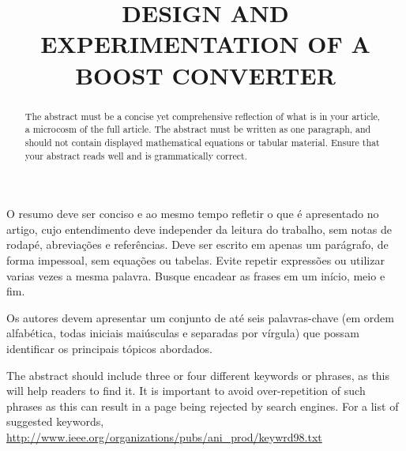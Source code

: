 \title{DESIGN AND EXPERIMENTATION OF A BOOST CONVERTER} %

\maketitle




\begin{resumo}  O resumo deve ser conciso e ao mesmo tempo refletir o que é apresentado no artigo, cujo entendimento deve independer da leitura do trabalho, sem notas de rodapé, abreviações e referências. Deve ser escrito em apenas um parágrafo, de forma impessoal, sem equações ou tabelas. Evite repetir expressões ou utilizar varias vezes a mesma palavra. Busque encadear as frases em um início, meio e fim.
\end{resumo}

\begin{palavraschave }
		Os autores devem apresentar um conjunto de até seis palavras-chave (em ordem alfabética, todas iniciais maiúsculas e separadas por vírgula) que possam identificar os principais tópicos abordados.	
\end{palavraschave }

\englishtitle

\begin{abstract}
	The abstract must be a concise yet comprehensive reflection of what is in your article, a microcosm of the full article. The abstract must be written as one paragraph, and should not contain displayed mathematical equations or tabular material.  Ensure that your abstract reads well and is grammatically correct.
\end{abstract}

\begin{keywords}
	The abstract should include three or four different keywords or phrases, as this will help readers to find it. It is important to avoid over-repetition of such phrases as this can result in a page being rejected by search engines. For a list of suggested keywords, \url{http://www.ieee.org/organizations/pubs/ani_prod/keywrd98.txt}
\end{keywords}

